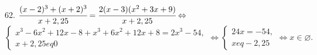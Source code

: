 62. $\cfrac{(x-2)^3+(x+2)^3}{x+2,25}=\cfrac{2(x-3)(x^2+3x+9)}{x+2,25}\Leftrightarrow$\\$
\begin{cases} x^3-6x^2+12x-8+x^3+6x^2+12x+8=2x^3-54,\\ x+2,25
eq0\end{cases}\Leftrightarrow
\begin{cases} 24x=-54,\\ x
eq-2,25\end{cases}\Leftrightarrow x\in \varnothing.$\\
